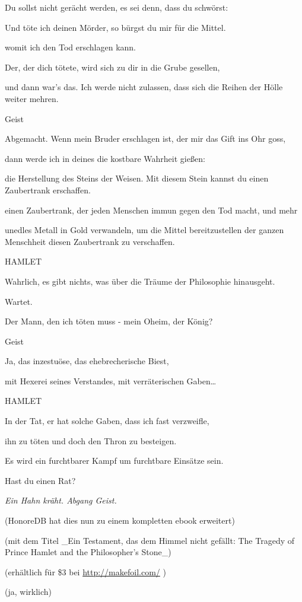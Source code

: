 {Du sollst nicht gerächt werden, es sei denn, dass du schwörst:

Und töte ich deinen Mörder, so bürgst du mir für die Mittel.

womit ich den Tod erschlagen kann.

Der, der dich tötete, wird sich zu dir in die Grube gesellen,

und dann war's das. Ich werde nicht zulassen, dass sich die Reihen der Hölle weiter mehren.

Geist

Abgemacht. Wenn mein Bruder erschlagen ist, der mir das Gift ins Ohr goss,

dann werde ich in deines die kostbare Wahrheit gießen:

die Herstellung des Steins der Weisen. Mit diesem Stein kannst du einen Zaubertrank erschaffen.

einen Zaubertrank, der jeden Menschen immun gegen den Tod macht, und mehr

unedles Metall in Gold verwandeln, um die Mittel bereitzustellen der ganzen Menschheit diesen Zaubertrank zu verschaffen.

HAMLET

Wahrlich, es gibt nichts, was über die Träume der Philosophie hinausgeht.

Wartet.

Der Mann, den ich töten muss - mein Oheim, der König?

Geist

Ja, das inzestuöse, das ehebrecherische Biest,

mit Hexerei seines Verstandes, mit verräterischen Gaben…

HAMLET

In der Tat, er hat solche Gaben, dass ich fast verzweifle,

ihn zu töten und doch den Thron zu besteigen.

Es wird ein furchtbarer Kampf um furchtbare Einsätze sein.

Hast du einen Rat?

\emph{Ein Hahn kräht. Abgang Geist.}

(HonoreDB hat dies nun zu einem kompletten ebook erweitert)

(mit dem Titel \_Ein Testament, das dem Himmel nicht gefällt: The Tragedy of Prince Hamlet and the Philosopher's Stone\_)

(erhältlich für \$3 bei \url{http://makefoil.com/} )

(ja, wirklich)

}
